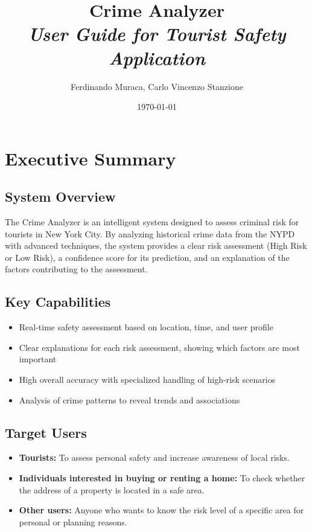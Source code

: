 \documentclass[11pt]{article}
\title{\Huge\textbf{Crime Analyzer}\\
       \Large\textit{User Guide for Tourist Safety Application}}
\author{Ferdinando Muraca, Carlo Vincenzo Stanzione}
\date{\today}
\begin{document}
\maketitle
\tableofcontents
\newpage

\section{Executive Summary}

\subsection{System Overview}
The Crime Analyzer is an intelligent system designed to assess criminal risk for tourists in New York City. By analyzing historical crime data from the NYPD with advanced techniques, the system provides a clear risk assessment (High Risk or Low Risk), a confidence score for its prediction, and an explanation of the factors contributing to the assessment.

\subsection{Key Capabilities}
\begin{itemize}[leftmargin=*]
\item Real-time safety assessment based on location, time, and user profile
\item Clear explanations for each risk assessment, showing which factors are most important
\item High overall accuracy with specialized handling of high-risk scenarios
\item Analysis of crime patterns to reveal trends and associations
\end{itemize}

\subsection{Target Users}
\begin{itemize}[leftmargin=*]
\item \textbf{Tourists:} To assess personal safety and increase awareness of local risks.
\item \textbf{Individuals interested in buying or renting a home:} To check whether the address of a property is located in a safe area.
\item \textbf{Other users:} Anyone who wants to know the risk level of a specific area for personal or planning reasons.
\end{itemize}
\end{document}
